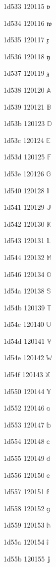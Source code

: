 \documentclass[11pt]{article}
\begin{document}
1d533 120115 \ensuremath{\mathfrak{v}}

1d534 120116 \ensuremath{\mathfrak{w}}

1d535 120117 \ensuremath{\mathfrak{x}}

1d536 120118 \ensuremath{\mathfrak{y}}

1d537 120119 \ensuremath{\mathfrak{z}}

1d538 120120 \ensuremath{\mathbb{A}}

1d539 120121 \ensuremath{\mathbb{B}}

1d53b 120123 \ensuremath{\mathbb{D}}

1d53c 120124 \ensuremath{\mathbb{E}}

1d53d 120125 \ensuremath{\mathbb{F}}

1d53e 120126 \ensuremath{\mathbb{G}}

1d540 120128 \ensuremath{\mathbb{I}}

1d541 120129 \ensuremath{\mathbb{J}}

1d542 120130 \ensuremath{\mathbb{K}}

1d543 120131 \ensuremath{\mathbb{L}}

1d544 120132 \ensuremath{\mathbb{M}}

1d546 120134 \ensuremath{\mathbb{O}}

1d54a 120138 \ensuremath{\mathbb{S}}

1d54b 120139 \ensuremath{\mathbb{T}}

1d54c 120140 \ensuremath{\mathbb{U}}

1d54d 120141 \ensuremath{\mathbb{V}}

1d54e 120142 \ensuremath{\mathbb{W}}

1d54f 120143 \ensuremath{\mathbb{X}}

1d550 120144 \ensuremath{\mathbb{Y}}

1d552 120146 \ensuremath{\mathbb{a}}

1d553 120147 \ensuremath{\mathbb{b}}

1d554 120148 \ensuremath{\mathbb{c}}

1d555 120149 \ensuremath{\mathbb{d}}

1d556 120150 \ensuremath{\mathbb{e}}

1d557 120151 \ensuremath{\mathbb{f}}

1d558 120152 \ensuremath{\mathbb{g}}

1d559 120153 \ensuremath{\mathbb{h}}

1d55a 120154 \ensuremath{\mathbb{i}}

1d55b 120155 \ensuremath{\mathbb{j}}
\end{document}
